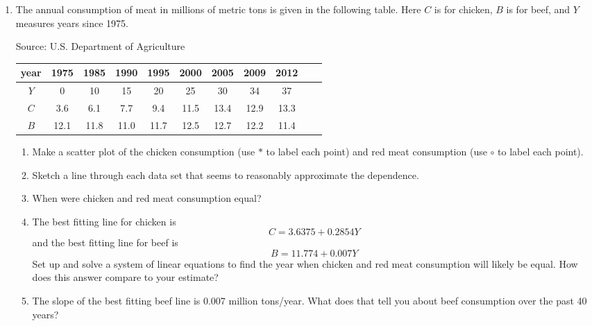 \begin{enumerate}
\item The annual consumption of meat in millions of metric tons is given in the following table. Here $C$ is for chicken, $B$ is for beef, and $Y$ measures years since 1975.

\hfill \begin{footnotesize} Source: U.S. Department of Agriculture \end{footnotesize}
\begin{center}
\begin{tabular} {|c| |c |c |c |c |c |c |c |c |c |c|}\hline
year & 1975 & 1985 & 1990 & 1995 & 2000 & 2005 & 2009 & 2012\\ \hline
$Y$ & 0 & 10 & 15 & 20 & 25 & 30 & 34 & 37\\ \hline
$C$ & 3.6 & 6.1 & 7.7 &9.4 & 11.5 & 13.4 & 12.9 & 13.3\\ \hline
$B$ & 12.1 & 11.8 & 11.0 & 11.7 & 12.5 & 12.7 & 12.2 & 11.4\\ \hline
\end{tabular}
\end{center}
\begin{enumerate}
\item Make a scatter plot of the chicken consumption (use $\ast$ to label each point) and red meat consumption (use $\circ$ to label each point).
\item Sketch a line through each data set that seems to reasonably approximate the dependence.
\item When were chicken and red meat consumption equal?
\item The best fitting line for chicken is $$C =3.6375+0.2854Y$$ and the best fitting line for beef is $$B=11.774+0.007Y$$  Set up and solve a system of linear equations to find the year when  chicken and red meat consumption will likely be equal.  How does this answer compare to your estimate?
\item The slope of the best fitting beef line is 0.007 million tons/year. What does that tell you about beef consumption over the past 40 years?
\end{enumerate}  %

\end{enumerate}
